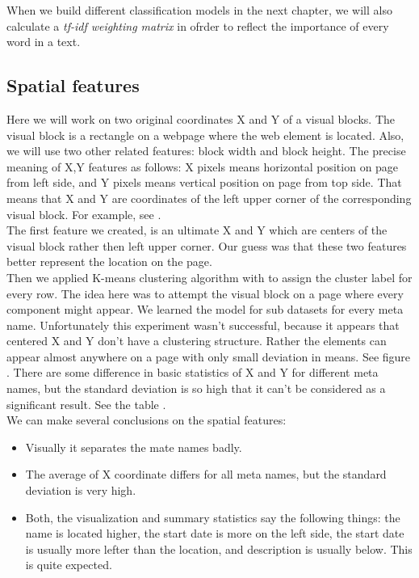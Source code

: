 When we build different classification models in the next chapter, we will also calculate a \textit{tf-idf weighting matrix} in ofrder to reflect the importance of every word in a text.

\subsection{Spatial features}

Here we will work on two original coordinates X and Y of a visual blocks. The visual block is a rectangle on a webpage where the web element is located. Also, we will use two other related features: block width and block height. The precise meaning of X,Y features as follows: X pixels means horizontal position on page from left side, and Y pixels means vertical position on page from top side. That means that X and Y are coordinates of the left upper corner of the corresponding visual block. For example, see .\\

The first feature we created, is an ultimate X and Y which are centers of the visual block rather then left upper corner. Our guess was that these two features better represent the location on the page.\\

Then we applied K-means clustering algorithm with to assign the cluster label for every row. The idea here was to attempt the visual block on a page where every component might appear. We learned the model for sub datasets for every meta name. Unfortunately this experiment wasn't successful, because it appears that centered X and Y don't have a clustering structure. Rather the elements can appear almost anywhere on a page with only small deviation in means. See figure . There are some difference in basic statistics of X and Y for different meta names, but the standard deviation is so high that it can't be considered as a significant result. See the table . \\

We can make several conclusions on the spatial features:
\begin{itemize}
    \item Visually it separates the mate names badly.
    \item The average of X coordinate differs for all meta names, but the standard deviation is very high.
    \item Both, the visualization and summary statistics say the following things: the name is located higher, the start date is more on the left side, the start date is usually more lefter than the location, and description is usually below. This is quite expected.   
\end{itemize}

